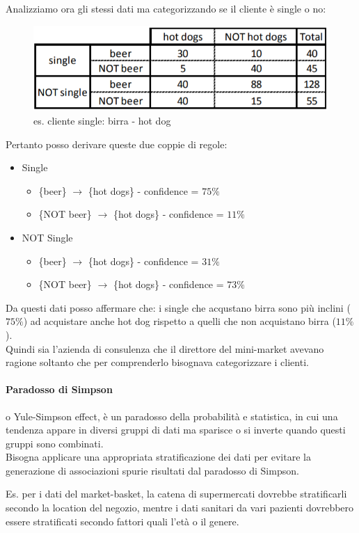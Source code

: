 Analizziamo ora gli stessi dati ma categorizzando se il cliente è single o no:
\begin{figure}[H]
	\centering
	\includegraphics[height=0.2 \linewidth]{association/pict/beer_hotdog_single.png}
	\caption{es. cliente single: birra - hot dog}
\end{figure}
Pertanto posso derivare queste due coppie di regole:
\begin{itemize}
	\item Single
	\begin{itemize}
		\item \{beer\} $\rightarrow$ \{hot dogs\} - confidence = $75\%$
		\item \{NOT beer\} $\rightarrow$ \{hot dogs\} - confidence = $11\%$
	\end{itemize}
	\item NOT Single
	\begin{itemize}
		\item \{beer\} $\rightarrow$ \{hot dogs\} - confidence = $31\%$
		\item \{NOT beer\} $\rightarrow$ \{hot dogs\} - confidence = $73\%$
	\end{itemize}
\end{itemize}
Da questi dati posso affermare che: i single che acqustano birra sono più inclini ($75\%$) ad acquistare anche hot dog rispetto a quelli che non acquistano birra ($11\%$).\\

Quindi sia l'azienda di consulenza che il direttore del mini-market avevano ragione soltanto che per comprenderlo bisognava categorizzare i clienti. 

\paragraph{Paradosso di Simpson} o Yule-Simpson effect, è un paradosso della probabilità e statistica, in cui una tendenza appare in diversi gruppi di dati ma sparisce o si inverte quando questi gruppi sono combinati. \\

Bisogna applicare una appropriata stratificazione dei dati per evitare la generazione di associazioni spurie risultati dal paradosso di Simpson. 

Es. per i dati del market-basket, la catena di supermercati dovrebbe stratificarli secondo la location del negozio, mentre i dati sanitari da vari pazienti dovrebbero essere stratificati secondo fattori quali l'età o il genere.